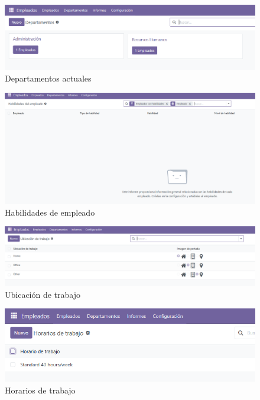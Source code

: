 \documentclass[a4paper,12pt]{article}
\begin{document}
\begin{figure}[h!]
    \centering
    \includegraphics[width=1\textwidth]{pr2odoo19-departamentos.png}
    \caption{Departamentos actuales}
\end{figure}
\FloatBarrier

\begin{figure}[h!]
    \centering
    \includegraphics[width=1\textwidth]{pr2odoo20-habilidadesDeEmpleado.png}
    \caption{Habilidades de empleado}
\end{figure}
\FloatBarrier

\begin{figure}[h!]
    \centering
    \includegraphics[width=1\textwidth]{pr2odoo21-ubicacionDeTrabajo.png}
    \caption{Ubicación de trabajo}
\end{figure}
\FloatBarrier

\begin{figure}[h!]
    \centering
    \includegraphics[width=1\textwidth]{pr2odoo22-horarios.png}
    \caption{Horarios de trabajo}
\end{figure}
\FloatBarrier
\end{document}
